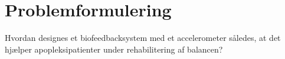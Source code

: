 \section{Problemformulering}
Hvordan designes et biofeedbacksystem med et accelerometer således, at det hjælper apopleksipatienter under rehabilitering af balancen?
%
%
%
